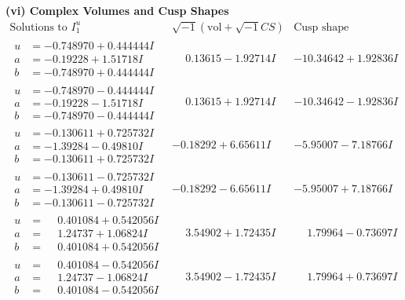 \documentclass[1p]{elsarticle_modified}
\theoremstyle{definition}
\newcommand{\I}{\sqrt{-1}}
\begin{document}
\newpage\flushleft \textbf{(vi) Complex Volumes and Cusp Shapes}
$$\begin{array}{c|c|c}  
\text{Solutions to }I^u_{1}& \I (\text{vol} + \sqrt{-1}CS) & \text{Cusp shape}\\
 \hline 
\begin{aligned}
u &= -0.748970 + 0.444444 I \\
a &= -0.19228 + 1.51718 I \\
b &= -0.748970 + 0.444444 I\end{aligned}
 & \phantom{-}0.13615 - 1.92714 I & -10.34642 + 1.92836 I \\ \hline\begin{aligned}
u &= -0.748970 - 0.444444 I \\
a &= -0.19228 - 1.51718 I \\
b &= -0.748970 - 0.444444 I\end{aligned}
 & \phantom{-}0.13615 + 1.92714 I & -10.34642 - 1.92836 I \\ \hline\begin{aligned}
u &= -0.130611 + 0.725732 I \\
a &= -1.39284 - 0.49810 I \\
b &= -0.130611 + 0.725732 I\end{aligned}
 & -0.18292 + 6.65611 I & -5.95007 - 7.18766 I \\ \hline\begin{aligned}
u &= -0.130611 - 0.725732 I \\
a &= -1.39284 + 0.49810 I \\
b &= -0.130611 - 0.725732 I\end{aligned}
 & -0.18292 - 6.65611 I & -5.95007 + 7.18766 I \\ \hline\begin{aligned}
u &= \phantom{-}0.401084 + 0.542056 I \\
a &= \phantom{-}1.24737 + 1.06824 I \\
b &= \phantom{-}0.401084 + 0.542056 I\end{aligned}
 & \phantom{-}3.54902 + 1.72435 I & \phantom{-}1.79964 - 0.73697 I \\ \hline\begin{aligned}
u &= \phantom{-}0.401084 - 0.542056 I \\
a &= \phantom{-}1.24737 - 1.06824 I \\
b &= \phantom{-}0.401084 - 0.542056 I\end{aligned}
 & \phantom{-}3.54902 - 1.72435 I & \phantom{-}1.79964 + 0.73697 I \\ \hline\begin{aligned}

\end{aligned}
\end{array}$$
\end{document}
